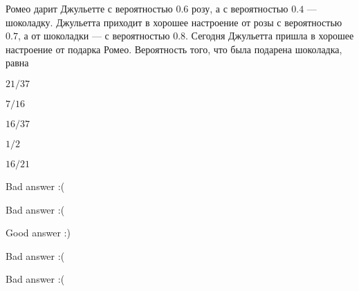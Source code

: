 
\begin{question}
Ромео дарит Джульетте с вероятностью \(0.6\) розу, а с вероятностью
\(0.4\) — шоколадку. Джульетта приходит в хорошее настроение от розы с
вероятностью \(0.7\), а от шоколадки — с вероятностью \(0.8\). Сегодня
Джульетта пришла в хорошее настроение от подарка Ромео. Вероятность
того, что была подарена шоколадка, равна
\begin{answerlist}
  \item \(21/37\)
  \item \(7/16\)
  \item \(16/37\)
  \item \(1/2\)
  \item \(16/21\)
\end{answerlist}
\end{question}

\begin{solution}
\begin{answerlist}
  \item Bad answer :(
  \item Bad answer :(
  \item Good answer :)
  \item Bad answer :(
  \item Bad answer :(
\end{answerlist}
\end{solution}

